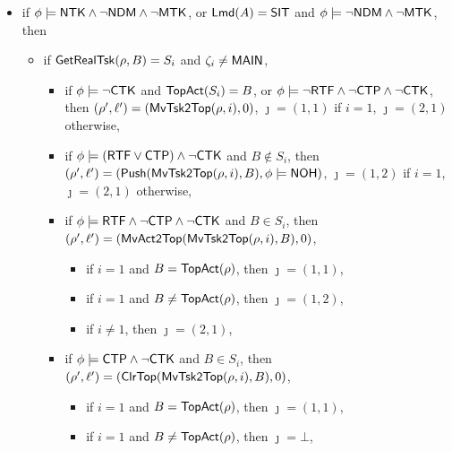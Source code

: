 {\begin{itemize}
\begin{itemize}
\begin{itemize}
\begin{itemize}
			\end{itemize}
            \item if $\phi\models\ctkflag$, then $(\rho',\ell') = (\clrtsk(\mvtsktop(\rho,i),B),\nohflag)$, $\jmath = \bot$ if $i = 1$, $\jmath = (2,1)$ otherwise,
        \end{itemize}
        \item if $\getrealtsk(\rho,B) = *$, then $(\rho',\ell') = (\newtsk(\rho, B, \ndmflag),\phi\models\nohflag)$, $\jmath = (2,1)$,
    \end{itemize}
	\item if $\phi \models {\sf NTK}\wedge\neg{\sf NDM}\wedge \neg {\sf MTK}$, or ${\sf Lmd}(A) = {\sf SIT}$ and $\phi  \models\neg{\sf NDM}\wedge \neg {\sf MTK}$, then
	\begin{itemize}
        \item if $\mathsf{GetRealTsk}(\rho, B) = S_i$ and $\zeta_i\neq{\sf MAIN}$,
            \begin{itemize}
            \item if $\phi\models\neg{\sf CTK}$ and $\mathsf{TopAct}(S_i) = B$, 
                or $\phi\models\neg{\sf RTF}\wedge\neg{\sf CTP}\wedge\neg{\sf CTK}$,
                then $(\rho',\ell')=(\mathsf{MvTsk2Top}(\rho, i), 0)$, $\jmath = (1,1)$ if $i = 1$, $\jmath = (2,1)$ otherwise,
            \item if $\phi\models({\sf RTF}\vee{\sf CTP})\wedge\neg{\sf CTK}$ and $B\notin S_i$, 
				then $(\rho',\ell')=(\mathsf{Push}(\mathsf{MvTsk2Top}(\rho, i), B),\phi\models{\sf NOH})$, $\jmath = (1,2)$ if $i = 1$, $\jmath = (2,1)$ otherwise,
            \item if $\phi \models {\sf RTF} \wedge \neg {\sf CTP}\wedge\neg{\sf CTK}$ and $B \in S_i$,
			then $(\rho',\ell')=(\mathsf{MvAct2Top}(\mathsf{MvTsk2Top}(\rho, i), B),0)$,
			\begin{itemize}
				\item if $i = 1$ and $B = \mathsf{TopAct}(\rho)$, then $\jmath = (1,1)$,
				\item if $i = 1$ and $B \neq \mathsf{TopAct}(\rho)$, then $\jmath = (1,2)$,
				\item if $i \neq 1$, then $\jmath = (2,1)$,
			\end{itemize}
            \item if $\phi \models{\sf CTP}\wedge\neg{\sf CTK}$ and $B \in S_i$, 
			then $(\rho',\ell') =(\mathsf{ClrTop}(\mathsf{MvTsk2Top}(\rho, i), B), 0)$, 
			\begin{itemize}
				\item if $i = 1$ and $B = \mathsf{TopAct}(\rho)$, then $\jmath = (1,1)$,
				\item if $i = 1$ and $B \neq \mathsf{TopAct}(\rho)$, then $\jmath = \bot$,

\end{itemize}
\end{itemize}
\end{itemize}
\end{itemize}}
